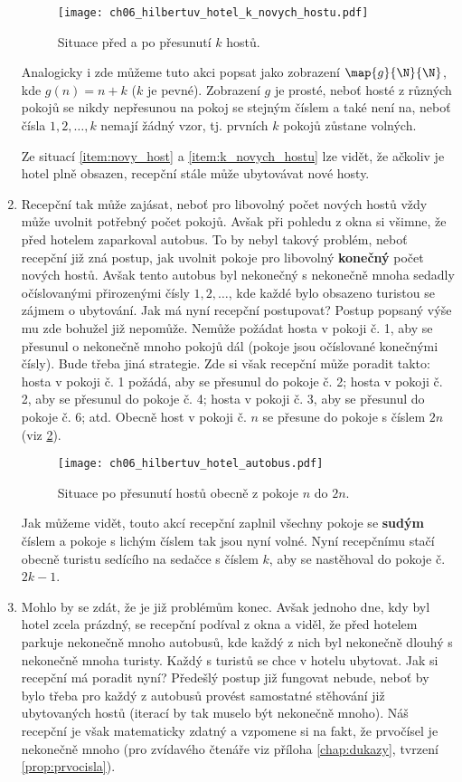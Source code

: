 \begin{enumerate}[label=\textit{(\roman*)}]
    \begin{figure}[h]
        \centering
        \texttt{[image: ch06\_hilbertuv\_hotel\_k\_novych\_hostu.pdf]}
        \caption{Situace před a po přesunutí $k$ hostů.}
        \label{fig:hilbertuv_hotel_k_novych_hostu}
    \end{figure}
    Analogicky i zde můžeme tuto akci popsat jako zobrazení $\map{g}{\N}{\N}$, kde $g(n)=n+k$ ($k$ je pevné). Zobrazení $g$ je prosté, neboť hosté z různých pokojů se nikdy nepřesunou na pokoj se stejným číslem a také není na, neboť čísla $1,2,\dots,k$ nemají žádný vzor, tj. prvních $k$ pokojů zůstane volných.\par
    Ze situací \ref{item:novy_host} a \ref{item:k_novych_hostu} lze vidět, že ačkoliv je hotel plně obsazen, recepční stále může ubytovávat nové hosty.
    \item Recepční tak může zajásat, neboť pro libovolný počet nových hostů vždy může uvolnit potřebný počet pokojů. Avšak při pohledu z okna si všimne, že před hotelem zaparkoval autobus. To by nebyl takový problém, neboť recepční již zná postup, jak uvolnit pokoje pro libovolný \textbf{konečný} počet nových hostů. Avšak tento autobus byl nekonečný s nekonečně mnoha sedadly očíslovanými přirozenými čísly $1,2,\dots$, kde každé bylo obsazeno turistou se zájmem o ubytování. Jak má nyní recepční postupovat? Postup popsaný výše mu zde bohužel již nepomůže. Nemůže požádat hosta v pokoji č. 1, aby se přesunul o nekonečně mnoho pokojů dál (pokoje jsou očíslované konečnými čísly). Bude třeba jiná strategie. Zde si však recepční může poradit takto: hosta v pokoji č. 1 požádá, aby se přesunul do pokoje č. 2; hosta v pokoji č. 2, aby se přesunul do pokoje č. 4; hosta v pokoji č. 3, aby se přesunul do pokoje č. 6; atd. Obecně host v pokoji č. $n$ se přesune do pokoje s číslem $2n$ (viz \ref{fig:hilbertuv_hotel_autobus}).
    \begin{figure}[h]
        \centering
        \texttt{[image: ch06\_hilbertuv\_hotel\_autobus.pdf]}
        \caption{Situace po přesunutí hostů obecně z pokoje $n$ do $2n$.}
        \label{fig:hilbertuv_hotel_autobus}
    \end{figure}
    Jak můžeme vidět, touto akcí recepční zaplnil všechny pokoje se \textbf{sudým} číslem a pokoje s lichým číslem tak jsou nyní volné. Nyní recepčnímu stačí obecně turistu sedícího na sedačce s číslem $k$, aby se nastěhoval do pokoje č. $2k-1$.
    \item Mohlo by se zdát, že je již problémům konec. Avšak jednoho dne, kdy byl hotel zcela prázdný, se recepční podíval z okna a viděl, že před hotelem parkuje nekonečně mnoho autobusů, kde každý z nich byl nekonečně dlouhý s nekonečně mnoha turisty. Každý s turistů se chce v hotelu ubytovat. Jak si recepční má poradit nyní? Předešlý postup již fungovat nebude, neboť by bylo třeba pro každý z autobusů provést samostatné stěhování již ubytovaných hostů (iterací by tak muselo být nekonečně mnoho). Náš recepční je však matematicky zdatný a vzpomene si na fakt, že prvočísel je nekonečně mnoho (pro zvídavého čtenáře viz příloha \ref{chap:dukazy}, tvrzení \ref{prop:prvocisla}).

\end{enumerate}
